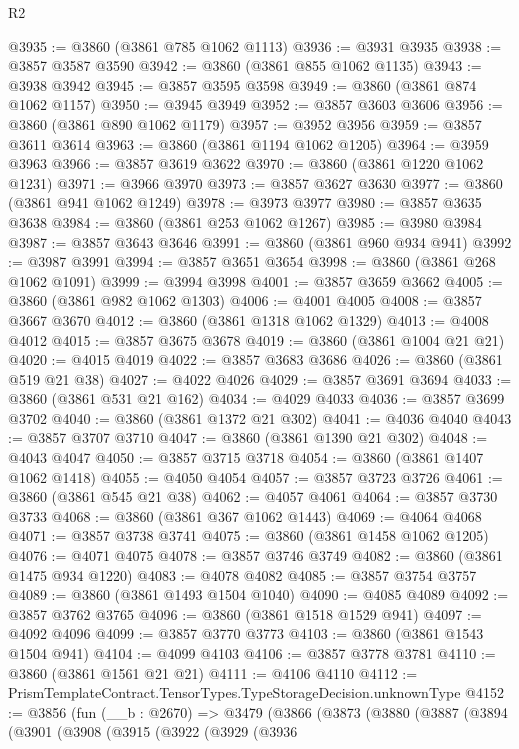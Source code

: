 \begin{lexlean}{R2}
\begin{coremodule}
@3935 := @3860 (@3861 @785 @1062 @1113)
@3936 := @3931 @3935
@3938 := @3857 @3587 @3590
@3942 := @3860 (@3861 @855 @1062 @1135)
@3943 := @3938 @3942
@3945 := @3857 @3595 @3598
@3949 := @3860 (@3861 @874 @1062 @1157)
@3950 := @3945 @3949
@3952 := @3857 @3603 @3606
@3956 := @3860 (@3861 @890 @1062 @1179)
@3957 := @3952 @3956
@3959 := @3857 @3611 @3614
@3963 := @3860 (@3861 @1194 @1062 @1205)
@3964 := @3959 @3963
@3966 := @3857 @3619 @3622
@3970 := @3860 (@3861 @1220 @1062 @1231)
@3971 := @3966 @3970
@3973 := @3857 @3627 @3630
@3977 := @3860 (@3861 @941 @1062 @1249)
@3978 := @3973 @3977
@3980 := @3857 @3635 @3638
@3984 := @3860 (@3861 @253 @1062 @1267)
@3985 := @3980 @3984
@3987 := @3857 @3643 @3646
@3991 := @3860 (@3861 @960 @934 @941)
@3992 := @3987 @3991
@3994 := @3857 @3651 @3654
@3998 := @3860 (@3861 @268 @1062 @1091)
@3999 := @3994 @3998
@4001 := @3857 @3659 @3662
@4005 := @3860 (@3861 @982 @1062 @1303)
@4006 := @4001 @4005
@4008 := @3857 @3667 @3670
@4012 := @3860 (@3861 @1318 @1062 @1329)
@4013 := @4008 @4012
@4015 := @3857 @3675 @3678
@4019 := @3860 (@3861 @1004 @21 @21)
@4020 := @4015 @4019
@4022 := @3857 @3683 @3686
@4026 := @3860 (@3861 @519 @21 @38)
@4027 := @4022 @4026
@4029 := @3857 @3691 @3694
@4033 := @3860 (@3861 @531 @21 @162)
@4034 := @4029 @4033
@4036 := @3857 @3699 @3702
@4040 := @3860 (@3861 @1372 @21 @302)
@4041 := @4036 @4040
@4043 := @3857 @3707 @3710
@4047 := @3860 (@3861 @1390 @21 @302)
@4048 := @4043 @4047
@4050 := @3857 @3715 @3718
@4054 := @3860 (@3861 @1407 @1062 @1418)
@4055 := @4050 @4054
@4057 := @3857 @3723 @3726
@4061 := @3860 (@3861 @545 @21 @38)
@4062 := @4057 @4061
@4064 := @3857 @3730 @3733
@4068 := @3860 (@3861 @367 @1062 @1443)
@4069 := @4064 @4068
@4071 := @3857 @3738 @3741
@4075 := @3860 (@3861 @1458 @1062 @1205)
@4076 := @4071 @4075
@4078 := @3857 @3746 @3749
@4082 := @3860 (@3861 @1475 @934 @1220)
@4083 := @4078 @4082
@4085 := @3857 @3754 @3757
@4089 := @3860 (@3861 @1493 @1504 @1040)
@4090 := @4085 @4089
@4092 := @3857 @3762 @3765
@4096 := @3860 (@3861 @1518 @1529 @941)
@4097 := @4092 @4096
@4099 := @3857 @3770 @3773
@4103 := @3860 (@3861 @1543 @1504 @941)
@4104 := @4099 @4103
@4106 := @3857 @3778 @3781
@4110 := @3860 (@3861 @1561 @21 @21)
@4111 := @4106 @4110
@4112 := PrismTemplateContract.TensorTypes.TypeStorageDecision.unknownType
@4152 := @3856
    (fun (__b : @2670) =>
    @3479
      (@3866
        (@3873
          (@3880
            (@3887
              (@3894
                (@3901
                  (@3908
                    (@3915
                      (@3922
                        (@3929
                          (@3936

\end{coremodule}
\end{lexlean}
